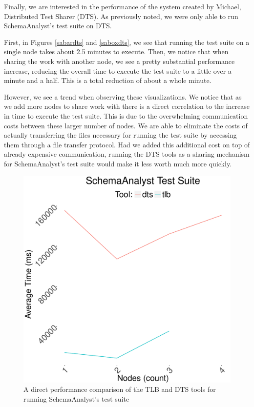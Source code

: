 \documentclass{article}
\begin{document}
{Finally, we are interested in the performance of the system created by Michael, Distributed Test Sharer (DTS).
As previously noted, we were only able to run SchemaAnalyst's test suite on DTS.

First, in Figures \ref{sabardts} and \ref{saboxdts}, we see that running the test suite on a single node takes
about 2.5 minutes to execute. Then, we notice that when sharing the work with another node, we see a pretty
substantial performance increase, reducing the overall time to execute the test suite to a little
over a minute and a half. This is a total reduction of about a whole minute.

However, we see a trend when observing these visualizations. We notice that as we add more nodes to share work
with there is a direct correlation to the increase in time to execute the test suite. This is due
to the overwhelming communication costs between these larger number of nodes. We are able to eliminate
the costs of actually transferring the files necessary for running the test suite by accessing them through
a file transfer protocol. Had we added this additional cost on top of already expensive communication, running
the DTS tools as a sharing mechanism for SchemaAnalyst's test suite would make it less worth much more quickly.

\begin{figure}[!ht]
    \centering
    \includegraphics[scale = 0.5]{../data/graphs/line_both.pdf}
    \caption{A direct performance comparison of the TLB and DTS tools for running SchemaAnalyst's test suite}
    \label{lineboth}
\end{figure}

}
\end{document}
